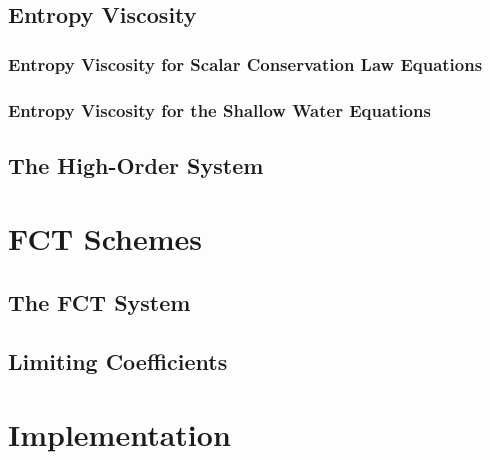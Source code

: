 \subsection{Entropy Viscosity\label{sec:entropy_viscosity}}
  \subsubsection{Entropy Viscosity for Scalar Conservation Law Equations
    \label{sec:entropy_viscosity_scalar}}
    
  \subsubsection{Entropy Viscosity for the Shallow Water Equations}
    
\subsection{The High-Order System}
  
\section{FCT Schemes}  
\subsection{The FCT System}
  
\subsection{Limiting Coefficients\label{sec:limiting_coefficients}}
  
  
  
  
\section{Implementation}  

